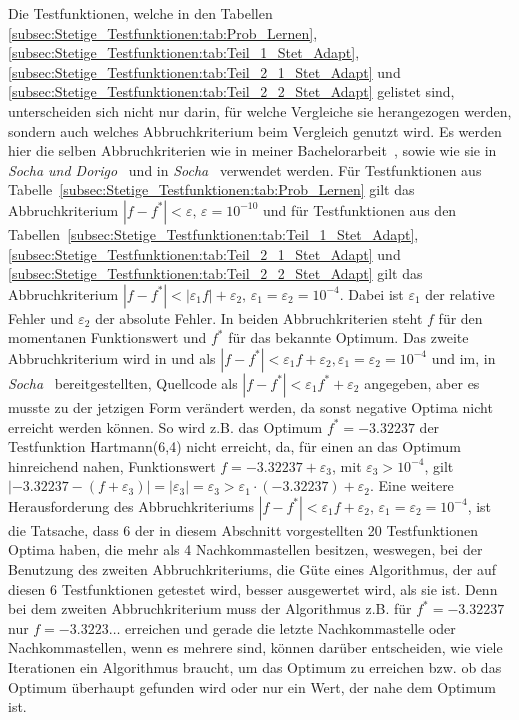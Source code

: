 \documentclass[fontsize=12, a4aper]{scrartcl}
\begin{document}
	Die Testfunktionen, welche in den Tabellen \ref{subsec:Stetige_Testfunktionen:tab:Prob_Lernen}, \ref{subsec:Stetige_Testfunktionen:tab:Teil_1_Stet_Adapt}, \ref{subsec:Stetige_Testfunktionen:tab:Teil_2_1_Stet_Adapt} und \ref{subsec:Stetige_Testfunktionen:tab:Teil_2_2_Stet_Adapt} gelistet sind, unterscheiden sich nicht nur darin, für welche Vergleiche sie herangezogen werden, sondern auch welches Abbruchkriterium beim Vergleich genutzt wird. Es werden hier die selben Abbruchkriterien wie in meiner Bachelorarbeit~\cite{FCM_2019}, sowie wie sie in \textit{Socha und Dorigo}~\cite{socha2008ant} und in \textit{Socha}~\cite{socha2009ant} verwendet werden. Für Testfunktionen aus Tabelle~\ref{subsec:Stetige_Testfunktionen:tab:Prob_Lernen} gilt das Abbruchkriterium \(|f - f^*| < \varepsilon, \, \varepsilon = 10^{-10}\) und für Testfunktionen aus den Tabellen~\ref{subsec:Stetige_Testfunktionen:tab:Teil_1_Stet_Adapt}, \ref{subsec:Stetige_Testfunktionen:tab:Teil_2_1_Stet_Adapt} und \ref{subsec:Stetige_Testfunktionen:tab:Teil_2_2_Stet_Adapt} gilt das Abbruchkriterium \(|f - f^*| < |\varepsilon_1 f| + \varepsilon_2, \, \varepsilon_1 = \varepsilon_2 = 10^{-4}\). Dabei ist \(\varepsilon_1\) der relative Fehler und \(\varepsilon_2\) der absolute Fehler. In beiden Abbruchkriterien steht \(f\) für den momentanen Funktionswert und \(f^*\) für das bekannte Optimum. Das zweite Abbruchkriterium wird in \cite{socha2008ant} und \cite{socha2009ant} als \(|f - f^*| < \varepsilon_1 f + \varepsilon_2, \varepsilon_1 = \varepsilon_2 = 10^{-
	4}\) und im, in \textit{Socha}~\cite{socha2009ant} bereitgestellten, Quellcode als \(|f - f^*| < \varepsilon_1 f^* + \varepsilon_2\) angegeben, aber es musste zu der jetzigen Form verändert werden, da sonst negative Optima nicht erreicht werden können. So wird z.B. das Optimum \(f^* = -3.32237\) der Testfunktion Hartmann(6,4) nicht erreicht, da, für einen an das Optimum hinreichend nahen, Funktionswert \(f = -3.32237 + \varepsilon_3\), mit \(\varepsilon_3 > 10^{-4}\), gilt \(|-3.32237 - (f + \varepsilon_3)| = |\varepsilon_3| = \varepsilon_3 > \varepsilon_1 \cdot (-3.32237) + \varepsilon_2\). Eine weitere Herausforderung des Abbruchkriteriums \(|f - f^*| < \varepsilon_1 f + \varepsilon_2, \, \varepsilon_1 = \varepsilon_2 = 10^{-4}\), ist die Tatsache, dass 6 der in diesem Abschnitt vorgestellten 20 Testfunktionen Optima haben, die mehr als 4 Nachkommastellen besitzen, weswegen, bei der Benutzung des zweiten Abbruchkriteriums, die Güte eines Algorithmus, der auf diesen 6 Testfunktionen getestet wird, besser ausgewertet wird, als sie ist. Denn bei dem zweiten Abbruchkriterium muss der Algorithmus z.B. für \(f^* = -3.32237\) nur \(f = -3.3223 \dots\) erreichen und gerade die letzte Nachkommastelle oder Nachkommastellen, wenn es mehrere sind, können darüber entscheiden, wie viele Iterationen ein Algorithmus braucht, um das Optimum zu erreichen bzw. ob das Optimum überhaupt gefunden wird oder nur ein Wert, der nahe dem Optimum ist.\hfill\newline
	
\end{document}
